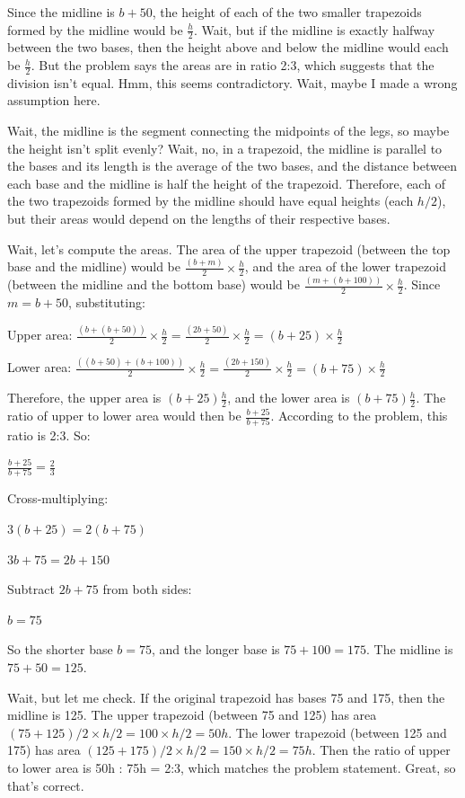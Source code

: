 \begin{tcolorbox}[
  title=Multiagent Collaborative Reasoning Trace Data Sample,
  breakable,
  colback=white,
  colframe=black
]
Since the midline is \( b + 50 \), the height of each of the two smaller trapezoids formed by the midline would be \( \frac{h}{2} \). Wait, but if the midline is exactly halfway between the two bases, then the height above and below the midline would each be \( \frac{h}{2} \). But the problem says the areas are in ratio 2:3, which suggests that the division isn't equal. Hmm, this seems contradictory. Wait, maybe I made a wrong assumption here.

Wait, the midline is the segment connecting the midpoints of the legs, so maybe the height isn't split evenly? Wait, no, in a trapezoid, the midline is parallel to the bases and its length is the average of the two bases, and the distance between each base and the midline is half the height of the trapezoid. Therefore, each of the two trapezoids formed by the midline should have equal heights (each \( h/2 \)), but their areas would depend on the lengths of their respective bases.

Wait, let's compute the areas. The area of the upper trapezoid (between the top base and the midline) would be \( \frac{(b + m)}{2} \times \frac{h}{2} \), and the area of the lower trapezoid (between the midline and the bottom base) would be \( \frac{(m + (b + 100))}{2} \times \frac{h}{2} \). Since \( m = b + 50 \), substituting:

Upper area: \( \frac{(b + (b + 50))}{2} \times \frac{h}{2} = \frac{(2b + 50)}{2} \times \frac{h}{2} = (b + 25) \times \frac{h}{2} \)

Lower area: \( \frac{( (b + 50) + (b + 100) )}{2} \times \frac{h}{2} = \frac{(2b + 150)}{2} \times \frac{h}{2} = (b + 75) \times \frac{h}{2} \)

Therefore, the upper area is \( (b + 25)\frac{h}{2} \), and the lower area is \( (b + 75)\frac{h}{2} \). The ratio of upper to lower area would then be \( \frac{b + 25}{b + 75} \). According to the problem, this ratio is 2:3. So:

\( \frac{b + 25}{b + 75} = \frac{2}{3} \)

Cross-multiplying:

\( 3(b + 25) = 2(b + 75) \)

\( 3b + 75 = 2b + 150 \)

Subtract \( 2b + 75 \) from both sides:

\( b = 75 \)

So the shorter base \( b = 75 \), and the longer base is \( 75 + 100 = 175 \). The midline is \( 75 + 50 = 125 \).

Wait, but let me check. If the original trapezoid has bases 75 and 175, then the midline is 125. The upper trapezoid (between 75 and 125) has area \( (75 + 125)/2 \times h/2 = 100 \times h/2 = 50h \). The lower trapezoid (between 125 and 175) has area \( (125 + 175)/2 \times h/2 = 150 \times h/2 = 75h \). Then the ratio of upper to lower area is 50h : 75h = 2:3, which matches the problem statement. Great, so that's correct.


\end{tcolorbox}
